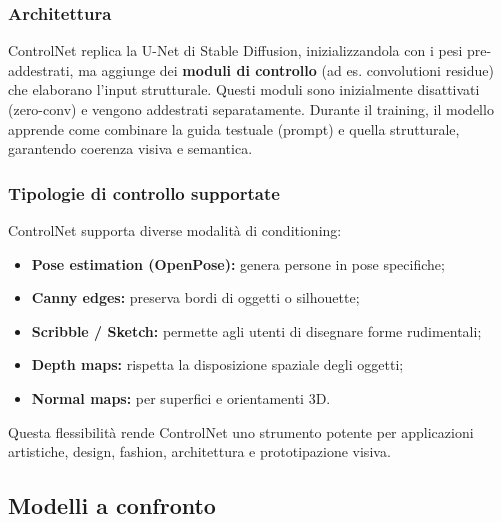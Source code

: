 \subsubsection*{Architettura}

ControlNet replica la U-Net di Stable Diffusion, inizializzandola con i pesi pre-addestrati, ma aggiunge dei \textbf{moduli di controllo} (ad es. convolutioni residue) che elaborano l’input strutturale. Questi moduli sono inizialmente disattivati (zero-conv) e vengono addestrati separatamente. Durante il training, il modello apprende come combinare la guida testuale (prompt) e quella strutturale, garantendo coerenza visiva e semantica.

\subsubsection*{Tipologie di controllo supportate}

ControlNet supporta diverse modalità di conditioning:

\begin{itemize}
    \item \textbf{Pose estimation (OpenPose):} genera persone in pose specifiche;
    \item \textbf{Canny edges:} preserva bordi di oggetti o silhouette;
    \item \textbf{Scribble / Sketch:} permette agli utenti di disegnare forme rudimentali;
    \item \textbf{Depth maps:} rispetta la disposizione spaziale degli oggetti;
    \item \textbf{Normal maps:} per superfici e orientamenti 3D.
\end{itemize}

Questa flessibilità rende ControlNet uno strumento potente per applicazioni artistiche, design, fashion, architettura e prototipazione visiva.

\subsection*{Modelli a confronto}

